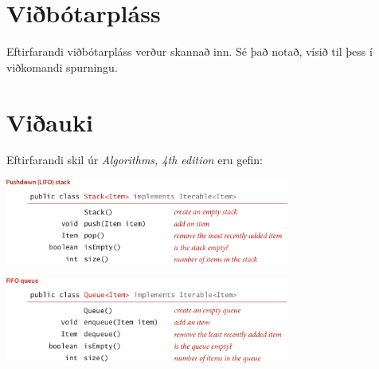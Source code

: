 \documentclass[addpoints]{exam}
\begin{document}
\newpage

\section{Viðbótarpláss}

Eftirfarandi viðbótarpláss verður skannað inn. Sé það notað, vísið til þess í viðkomandi spurningu.


\newpage


\newpage

\section{Viðauki}
Eftirfarandi skil úr \emph{Algorithms, 4th edition} eru gefin:
\begin{center}

	\includegraphics[width=0.7\textwidth]{Pics/API-Stack}

	\vspace{0.5cm}

	\includegraphics[width=0.7\textwidth]{Pics/API-Queue}









    
\end{center}
\end{document}
